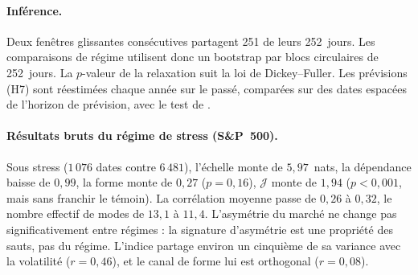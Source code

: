 \documentclass[11pt]{article}
\theoremstyle{definition}
\newcommand{\JJ}{\mathcal{J}}
\begin{document}
\paragraph{Inférence.} Deux fenêtres glissantes consécutives partagent 251 de
leurs 252~jours. Les comparaisons de régime utilisent donc un bootstrap par
blocs circulaires de 252~jours. La $p$-valeur de la relaxation suit la loi de
Dickey--Fuller. Les prévisions (H7) sont réestimées chaque année sur le passé,
comparées sur des dates espacées de l'horizon de prévision, avec le test de
\citet{dm1995}.

\paragraph{Résultats bruts du régime de stress (S\&P~500).} Sous stress
($1\,076$ dates contre $6\,481$), l'échelle monte de $5{,}97$~nats, la
dépendance baisse de $0{,}99$, la forme monte de $0{,}27$ ($p=0{,}16$), $\JJ$
monte de $1{,}94$ ($p<0{,}001$, mais sans franchir le témoin). La corrélation
moyenne passe de $0{,}26$ à $0{,}32$, le nombre effectif de modes de $13{,}1$
à $11{,}4$. L'asymétrie du marché ne change pas significativement entre
régimes : la signature d'asymétrie est une propriété des sauts, pas du régime.
L'indice partage environ un cinquième de sa variance avec la volatilité
($r=0{,}46$), et le canal de forme lui est orthogonal ($r=0{,}08$).

\begin{table}[htbp]
\centering
\footnotesize
{}
\caption{S\&P~500 : statistiques observées face au témoin i.i.d., 200
répétitions. $p$ : part des répétitions au moins aussi extrêmes dans le sens
prédit. \og À contre-sens \fg{} : le témoin dépasse les données.
Écarts : stress moins calme.}
\label{tab:placebo}
\end{table}

\begin{table}[htbp]
\centering
\footnotesize
{}
\caption{Secteurs FF49, 1990--2026 : mêmes conventions que le
tableau~\ref{tab:placebo}.}
\label{tab:placebo-ff49}
\end{table}
\end{document}
